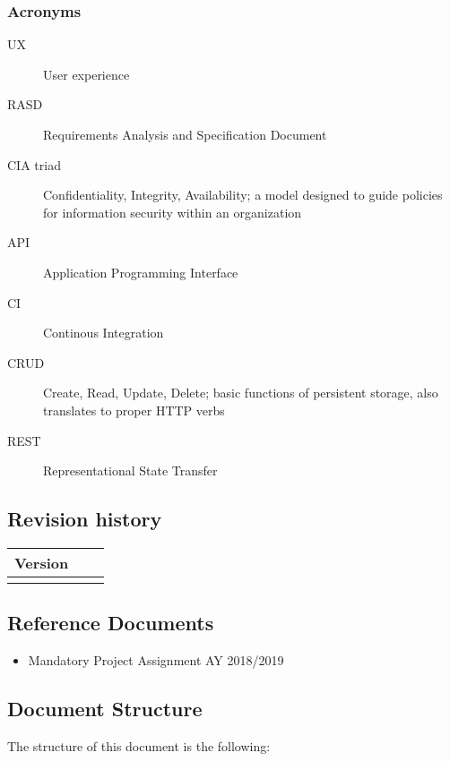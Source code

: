 \documentclass[../main.tex]{subfiles}
\begin{document}
	\subsubsection{Acronyms}
		\begin{description}
			\item[UX] User experience
			\item [RASD] Requirements Analysis and Specification Document
			\item [CIA triad] Confidentiality, Integrity, Availability; a model designed to guide policies for information security within an organization
			\item [API] Application Programming Interface
			\item [CI] Continous Integration
		    \item [CRUD] Create, Read, Update, Delete; basic functions of persistent storage, also translates to proper HTTP verbs
			\item [REST] Representational State Transfer
		\end{description}

\subsection{Revision history}
\begin{tabular}{p{1.2cm}|p{2.1cm}|p{2.6cm}}
	\bf Version & \bf \makebox[2.1cm][c]{Release Date} & \bf \makebox[3cm][c]{Description} \\
	\hline
	\makebox[1.2cm][c]{1.0} & \makebox[2.1cm][c]{10/12/2018} & \makebox[3cm][c]{Initial Release}\\
\end{tabular}

\subsection{Reference Documents}

\begin{itemize}

	\item{Mandatory Project Assignment AY 2018/2019}

\end{itemize}

\subsection{Document Structure}

The structure of this document is the following:
\end{document}
